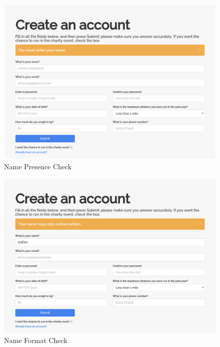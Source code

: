 \documentclass{article}[12pt,a4paper]
\begin{document}
\begin{figure}[h!]
  \includegraphics[scale=0.25]{images/testing/registration_validation/name_presence}
  \caption{Name Presence Check}
\end{figure}

\begin{figure}[h!]
  \includegraphics[scale=0.25]{images/testing/registration_validation/name_format}
  \caption{Name Format Check}
\end{figure}
\end{document}
